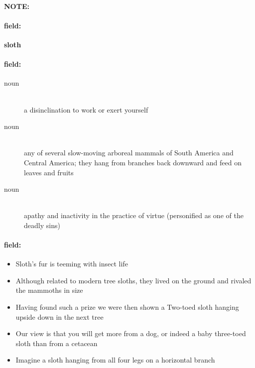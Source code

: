 \documentclass[12pt]{article}
\newenvironment{note}{\paragraph{NOTE:}}{}
\newenvironment{field}{\paragraph{field:}}{}
\begin{document}
\begin{note}
\begin{field}
\textbf{\large sloth}
\end{field}


\begin{field}
\begin{description}
\item[noun] \hfill \\ 
a disinclination to work or exert yourself

\item[noun] \hfill \\ 
any of several slow-moving arboreal mammals of South America and Central America; they hang from branches back downward and feed on leaves and fruits

\item[noun] \hfill \\ 
apathy and inactivity in the practice of virtue (personified as one of the deadly sins)

\end{description}
\end{field}

\begin{field}
\begin{itemize}
\item Sloth's fur is teeming with insect life
\item Although related to modern tree sloths, they lived on the ground and rivaled the mammoths in size
\item Having found such a prize we were then shown a Two-toed sloth hanging upside down in the next tree
\item Our view is that you will get more from a dog, or indeed a baby three-toed sloth than from a cetacean
\item Imagine a sloth hanging from all four legs on a horizontal branch
\end{itemize}
\end{field}
\end{note}
\end{document}
